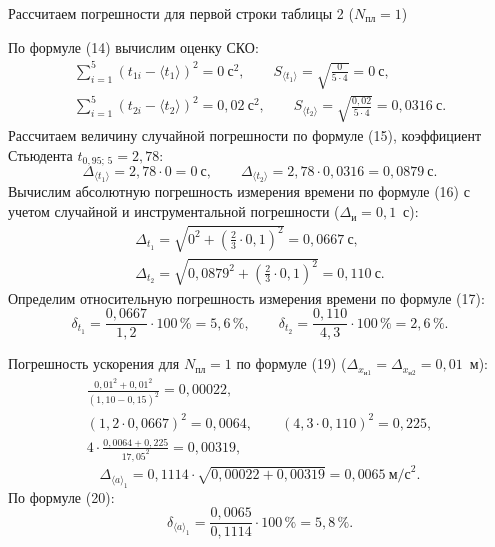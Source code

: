 \documentclass[12pt,a4paper]{article}
\let\oldsum\sum
\renewcommand{\sum}{\oldsum\limits}
\begin{document}
Рассчитаем погрешности для первой строки таблицы 2 ($N_\text{пл} = 1$)

По формуле (14) вычислим оценку СКО:
\begin{gather*}
\sum_{i=1}^{5}\left(t_{1i} - \langle t_1\rangle\right)^2 = 0\ \text{с}^2, \qquad 
S_{\langle t_1\rangle} = \sqrt{\frac{0}{5\cdot 4}} = 0\ \text{с},\\[4pt]
\sum_{i=1}^{5}\left(t_{2i} - \langle t_2\rangle\right)^2 = 0{,}02\ \text{с}^2,\qquad
S_{\langle t_2\rangle} = \sqrt{\frac{0{,}02}{5\cdot 4}} = 0{,}0316\ \text{с}.
\end{gather*}
Рассчитаем величину случайной погрешности по формуле (15), коэффициент Стьюдента $t_{0{,}95;\,5} = 2{,}78$:
\[
\Delta_{\langle t_1\rangle} = 2{,}78\cdot 0 = 0\ \text{с}, \qquad
\Delta_{\langle t_2\rangle} = 2{,}78\cdot 0{,}0316 = 0{,}0879\ \text{с}.
\]
Вычислим абсолютную погрешность измерения времени по формуле (16) с учетом случайной и инструментальной погрешности ($\Delta_\text{и} = 0{,}1$~с):
\begin{gather*}
\Delta_{t_1} = \sqrt{0^2 + \left(\tfrac{2}{3}\cdot 0{,}1\right)^2} = 0{,}0667\ \text{с},\\
\Delta_{t_2} = \sqrt{0{,}0879^2 + \left(\tfrac{2}{3}\cdot 0{,}1\right)^2} = 0{,}110\ \text{с}.
\end{gather*}
Определим относительную погрешность измерения времени по формуле (17):
\[
\delta_{t_1} = \frac{0{,}0667}{1{,}2}\cdot 100\,\% = 5{,}6\,\%, \qquad
\delta_{t_2} = \frac{0{,}110}{4{,}3}\cdot 100\,\% = 2{,}6\,\%.
\]

Погрешность ускорения для $N_\text{пл} = 1$ по формуле (19) ($\Delta_{x_{\text{и}1}} = \Delta_{x_{\text{и}2}} = 0{,}01$~м):
\begin{gather*}
\frac{0{,}01^2 + 0{,}01^2}{(1{,}10 - 0{,}15)^2} = 0{,}00022,\\
\left(1{,}2\cdot 0{,}0667\right)^2 = 0{,}0064, \qquad
\left(4{,}3\cdot 0{,}110\right)^2 = 0{,}225,\\
4\cdot\frac{0{,}0064 + 0{,}225}{17{,}05^2} = 0{,}00319,
\end{gather*}
\[
\Delta_{\langle a\rangle_1} = 0{,}1114\cdot\sqrt{0{,}00022 + 0{,}00319} = 0{,}0065\ \text{м/с}^2.
\]
По формуле (20):
\[
\delta_{\langle a\rangle_1} = \frac{0{,}0065}{0{,}1114}\cdot 100\,\% = 5{,}8\,\%.
\]
\end{document}

